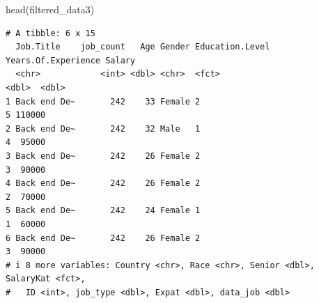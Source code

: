 \documentclass[
  letterpaper,
  DIV=11,
  numbers=noendperiod]{scrartcl}
\newenvironment{Shaded}{\begin{snugshade}}{\end{snugshade}}
\newcommand{\ConstantTok}[1]{\textcolor[rgb]{0.56,0.35,0.01}{#1}}
\newcommand{\FloatTok}[1]{\textcolor[rgb]{0.68,0.00,0.00}{#1}}
\newcommand{\FunctionTok}[1]{\textcolor[rgb]{0.28,0.35,0.67}{#1}}
\newcommand{\NormalTok}[1]{\textcolor[rgb]{0.00,0.23,0.31}{#1}}
\newcommand{\OtherTok}[1]{\textcolor[rgb]{0.00,0.23,0.31}{#1}}
\newcommand{\SpecialCharTok}[1]{\textcolor[rgb]{0.37,0.37,0.37}{#1}}
\newcommand{\StringTok}[1]{\textcolor[rgb]{0.13,0.47,0.30}{#1}}
\begin{document}
\begin{Shaded}
\end{Shaded}

\begin{Shaded}
\begin{Highlighting}[]
\FunctionTok{head}\NormalTok{(filtered\_data3)}
\end{Highlighting}
\end{Shaded}

\begin{verbatim}
# A tibble: 6 x 15
  Job.Title    job_count   Age Gender Education.Level Years.Of.Experience Salary
  <chr>            <int> <dbl> <chr>  <fct>                         <dbl>  <dbl>
1 Back end De~       242    33 Female 2                                 5 110000
2 Back end De~       242    32 Male   1                                 4  95000
3 Back end De~       242    26 Female 2                                 3  90000
4 Back end De~       242    26 Female 2                                 2  70000
5 Back end De~       242    24 Female 1                                 1  60000
6 Back end De~       242    26 Female 2                                 3  90000
# i 8 more variables: Country <chr>, Race <chr>, Senior <dbl>, SalaryKat <fct>,
#   ID <int>, job_type <dbl>, Expat <dbl>, data_job <dbl>
\end{verbatim}
\end{document}
